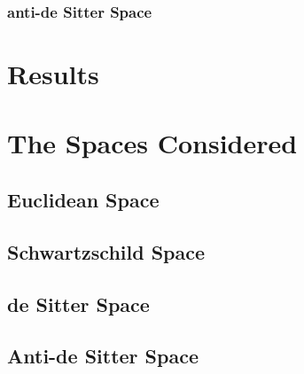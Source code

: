\documentclass{article}
\begin{document}
\subsubsection{anti-de Sitter Space}

\newpage
\section{Results}


\newpage
\appendix
\section{The Spaces Considered}
\subsection{Euclidean Space}
\subsection{Schwartzschild Space}
\subsection{de Sitter Space}
\subsection{Anti-de Sitter Space}
\end{document}
